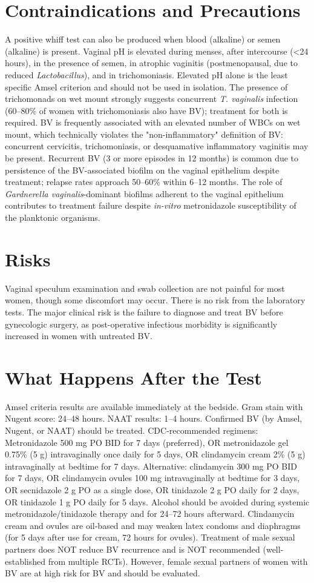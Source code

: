 \section*{Contraindications and Precautions}
A positive whiff test can also be produced when blood (alkaline) or semen (alkaline) is present. Vaginal pH is elevated during menses, after intercourse (<24 hours), in the presence of semen, in atrophic vaginitis (postmenopausal, due to reduced \textit{Lactobacillus}), and in trichomoniasis. Elevated pH alone is the least specific Amsel criterion and should not be used in isolation. The presence of trichomonads on wet mount strongly suggests concurrent \textit{T. vaginalis} infection (60--80\% of women with trichomoniasis also have BV); treatment for both is required. BV is frequently associated with an elevated number of WBCs on wet mount, which technically violates the "non-inflammatory" definition of BV: concurrent cervicitis, trichomoniasis, or desquamative inflammatory vaginitis may be present. Recurrent BV (3 or more episodes in 12 months) is common due to persistence of the BV-associated biofilm on the vaginal epithelium despite treatment; relapse rates approach 50--60\% within 6--12 months. The role of \textit{Gardnerella vaginalis}-dominant biofilms adherent to the vaginal epithelium contributes to treatment failure despite \textit{in-vitro} metronidazole susceptibility of the planktonic organisms.

\section*{Risks}
Vaginal speculum examination and swab collection are not painful for most women, though some discomfort may occur. There is no risk from the laboratory tests. The major clinical risk is the failure to diagnose and treat BV before gynecologic surgery, as post-operative infectious morbidity is significantly increased in women with untreated BV.

\section*{What Happens After the Test}
Amsel criteria results are available immediately at the bedside. Gram stain with Nugent score: 24--48 hours. NAAT results: 1--4 hours. Confirmed BV (by Amsel, Nugent, or NAAT) should be treated. CDC-recommended regimens: Metronidazole 500 mg PO BID for 7 days (preferred), OR metronidazole gel 0.75\% (5 g) intravaginally once daily for 5 days, OR clindamycin cream 2\% (5 g) intravaginally at bedtime for 7 days. Alternative: clindamycin 300 mg PO BID for 7 days, OR clindamycin ovules 100 mg intravaginally at bedtime for 3 days, OR secnidazole 2 g PO as a single dose, OR tinidazole 2 g PO daily for 2 days, OR tinidazole 1 g PO daily for 5 days. Alcohol should be avoided during systemic metronidazole/tinidazole therapy and for 24--72 hours afterward. Clindamycin cream and ovules are oil-based and may weaken latex condoms and diaphragms (for 5 days after use for cream, 72 hours for ovules). Treatment of male sexual partners does NOT reduce BV recurrence and is NOT recommended (well-established from multiple RCTs). However, female sexual partners of women with BV are at high risk for BV and should be evaluated.

